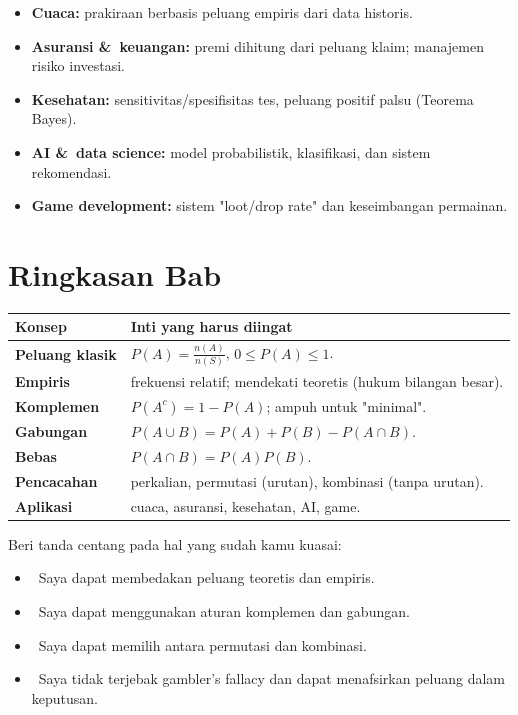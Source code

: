 \documentclass[11pt,a4paper]{report}
\theoremstyle{gaya}
\newcommand{\cek}{\ding{113}\ } %
\begin{document}
\begin{dunianyata}
\begin{itemize}[leftmargin=*,topsep=2pt]
  \item \textbf{Cuaca:} prakiraan berbasis peluang empiris dari data historis.
  \item \textbf{Asuransi \&\ keuangan:} premi dihitung dari peluang klaim; manajemen risiko investasi.
  \item \textbf{Kesehatan:} sensitivitas/spesifisitas tes, peluang positif palsu (Teorema Bayes).
  \item \textbf{AI \&\ data science:} model probabilistik, klasifikasi, dan sistem rekomendasi.
  \item \textbf{Game development:} sistem "loot/drop rate" dan keseimbangan permainan.
\end{itemize}
\end{dunianyata}

\section*{Ringkasan Bab}
\begin{center}
\begin{tabular}{>{\bfseries}p{3.5cm} p{10.2cm}}
\toprule
Konsep & Inti yang harus diingat \\
\midrule
Peluang klasik & $P(A)=\tfrac{n(A)}{n(S)}$, $0\le P(A)\le1$. \\
Empiris & frekuensi relatif; mendekati teoretis (hukum bilangan besar). \\
Komplemen & $P(A^c)=1-P(A)$; ampuh untuk "minimal". \\
Gabungan & $P(A\cup B)=P(A)+P(B)-P(A\cap B)$. \\
Bebas & $P(A\cap B)=P(A)P(B)$. \\
Pencacahan & perkalian, permutasi (urutan), kombinasi (tanpa urutan). \\
Aplikasi & cuaca, asuransi, kesehatan, AI, game. \\
\bottomrule
\end{tabular}
\end{center}

\begin{refleksi}
Beri tanda centang pada hal yang sudah kamu kuasai:
\begin{itemize}[leftmargin=*,label={},topsep=2pt]
  \item \cek Saya dapat membedakan peluang teoretis dan empiris.
  \item \cek Saya dapat menggunakan aturan komplemen dan gabungan.
  \item \cek Saya dapat memilih antara permutasi dan kombinasi.
  \item \cek Saya tidak terjebak gambler's fallacy dan dapat menafsirkan peluang dalam keputusan.
\end{itemize}
\end{refleksi}
\end{document}
